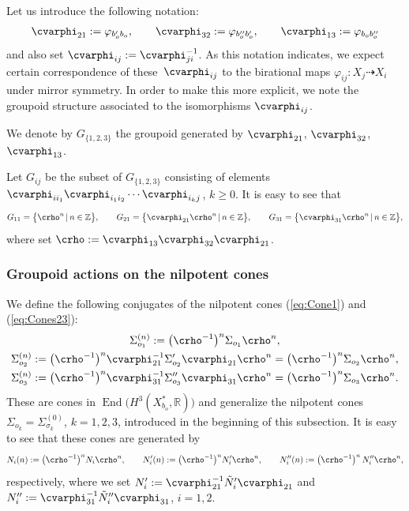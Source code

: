 \documentclass[pdftex]{sigma}
\numberwithin{equation}{section}
\begin{document}
Let us introduce the following notation:
\begin{gather*}
\cvarphi_{21}:=\varphi_{b_{o}'b_{o}},\qquad \cvarphi_{32}:=\varphi_{b_{o}''b_{o}'},\qquad \cvarphi_{13}:=\varphi_{b_{o}b_{o}''}
\end{gather*}
and also set $\cvarphi_{ij}:=\cvarphi_{ji}^{-1}$. As this notation indicates, we expect certain correspondence of these~$\cvarphi_{ij}$ to the birational maps $\varphi_{ij}\colon X_{j}\dashrightarrow X_{i}$ under mirror symmetry. In order to make this more explicit, we note the groupoid structure associated to the isomorphisms $\cvarphi_{ij}$.
\begin{Definition}\label{def:crho}We denote by $G_{\{1,2,3\}}$ the groupoid generated by $\cvarphi_{21}$, $\cvarphi_{32}$, $\cvarphi_{13}$.
\end{Definition}
Let $G_{ij}$ be the subset of $G_{\{1,2,3\}}$ consisting of elements $\cvarphi_{ii_{1}}\cvarphi_{i_{1}i_{2}}\cdots\cvarphi_{i_{k}j}$, $k\geq0$. It is easy to see that
\begin{gather*}
G_{11}=\big\{ \crho^{n}\,|\, n\in\mathbb{Z}\big\} ,\qquad G_{21}=\big\{ \cvarphi_{21}\crho^{n}\,|\, n\in\mathbb{Z}\big\} ,\qquad G_{31}=\big\{ \cvarphi_{31}\crho^{n}\,|\, n\in\mathbb{Z}\big\} ,
\end{gather*}
where set $\crho:=\cvarphi_{13}\cvarphi_{32}\cvarphi_{21}$.

\subsubsection{Groupoid actions on the nilpotent cones} \label{para:Sigma(n)-and-Ni(n)}
We define the following conjugates of the nilpotent cones (\ref{eq:Cone1}) and (\ref{eq:Cones23}):
\begin{gather*}
\Sigma_{o_{1}}^{(n)}:=\big(\crho^{-1}\big)^{n}\Sigma_{o_{1}}\crho^{n},\\
\Sigma_{o_{2}}^{(n)}:=\big(\crho^{-1}\big)^{n}\cvarphi_{21}^{-1}\Sigma_{o_{2}}'\cvarphi_{21}\crho^{n} =\big(\crho^{-1}\big)^{n}\Sigma_{o_{2}}\crho^{n},\\
\Sigma_{o_{3}}^{(n)}:=\big(\crho^{-1}\big)^{n}\cvarphi_{31}^{-1}\Sigma_{o_{3}}''\cvarphi_{31}\crho^{n} =\big(\crho^{-1}\big)^{n}\Sigma_{o_{3}}\crho^{n}.
\end{gather*}
These are cones in $\operatorname{End}\big(H^{3}(X_{b_{o}}^{*},\mathbb{R})\big)$ and generalize the nilpotent cones $\Sigma_{o_{k}}=\Sigma_{\sigma_{k}}^{(0)}$, $k=1,2,3$, introduced in the beginning of this subsection. It is easy to see that these cones are generated by
\begin{gather*}
N_{i}(n):=\big(\crho^{-1}\big)^{n} N_{i} \crho^{n},\qquad N_{i}'(n):=\big(\crho^{-1}\big)^{n} N_{i}' \crho^{n},\qquad N_{i}''(n):=\big(\crho^{-1}\big)^{n}\,N_{i}'' \crho^{n},
\end{gather*}
respectively, where we set $N_{i}':=\cvarphi_{21}^{-1}\tilde{N}_{i}'\cvarphi_{21}$ and $N_{i}'':=\cvarphi_{31}^{-1}\tilde{N}_{i}''\cvarphi_{31}$, $i=1,2$.
\end{document}
